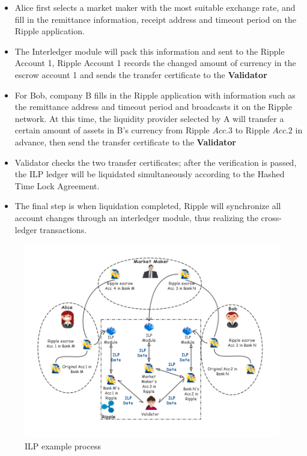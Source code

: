 \begin{itemize}
    \item Alice first selects a market maker with the most suitable exchange rate, and fill in the remittance information, receipt address and timeout period on the Ripple application.
    \item The Interledger module will pack this information and sent to the Ripple Account 1, Ripple Account 1 records the changed amount of currency in the escrow account 1 and sends the transfer certificate to the \textbf{Validator}
    \item For Bob, company B fills in the Ripple application with information such as the remittance address and timeout period and broadcasts it on the Ripple network. At this time, the liquidity provider selected by A will transfer a certain amount of assets in B's currency from Ripple $Acc.3$ to Ripple $Acc.2$ in advance, then send the transfer certificate to the \textbf{Validator}
    \item Validator checks the two transfer certificates; after the verification is passed, the ILP ledger will be liquidated simultaneously according to the Hashed Time Lock Agreement.
    \item The final step is when liquidation completed, Ripple will synchronize all account changes through an interledger module, thus realizing the cross-ledger transactions.
\end{itemize}
        \begin{figure}[H]
        \includegraphics[width=1\textwidth]{./figures/ILP.png}
        \centering
        \caption{ILP example process}%
        \centering
        \label{fig:ILP}
        \end{figure}
        

